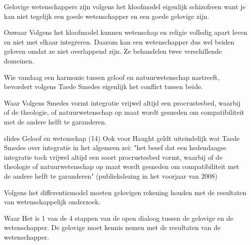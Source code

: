 \documentclass[main.tex]{subfiles}
\begin{document}
\begin{examenvraag}
    \begin{stelling}
        Gelovige wetenschappers zijn volgens het kloofmodel eigenlijk schizofreen want je kan niet tegelijk een goede wetenschapper en een goede gelovige zijn.
    \end{stelling}

    \begin{stelling-antwoord}{Onwaar}
		Volgens het kloofmodel kunnen wetenschap en religie volledig apart leven en niet met elkaar
		integreren. Daarom kan een wetenschapper dus wel beiden geloven omdat ze niet overlappend zijn.
		Ze behandelen twee verschillende domeinen.
    \end{stelling-antwoord}
\end{examenvraag}


\begin{examenvraag}
    \begin{stelling}
        Wie vandaag een harmonie tussen geloof en natuurwetenschap nastreeft, bevordert volgens Taede Smedes eigenlijk het conflict tussen beide.
    \end{stelling}

    \begin{stelling-antwoord}{Waar}
    Volgens Smedes vormt integratie vrijwel altijd een procrustesbed, waarbij of de theologie, of natuurwetenschap op maat wordt gesneden om compatibiliteit met de andere helft te garanderen.
    
     \begin{citaat}{slides Geloof en wetenschap (14)}
	     Ook voor Haught geldt uiteindelijk wat Taede Smedes over integratie in het algemeen zei: "het besef dat een hedendaagse integratie toch vrijwel altijd een soort procrustesbed vormt, waarbij of de theologie of natuurwetenschap op maat wordt gesneden om compatibiliteit met de andere helft te garanderen" (publiekslezing in het voorjaar van 2008)
   	\end{citaat}			
    
    \end{stelling-antwoord}
\end{examenvraag}


\begin{examenvraag}
    \begin{stelling}
        Volgens het differentiemodel moeten gelovigen rekening houden met de resultaten van wetenschappelijk onderzoek.
    \end{stelling}

    \begin{stelling-antwoord}{Waar}
		Het is 1 van de 4 stappen van de open dialoog tussen de gelovige en de wetenschapper. De gelovige moet kennis nemen met de resultaten van de wetenschapper.		
       
  	\end{stelling-antwoord}
\end{examenvraag}
\end{document}
